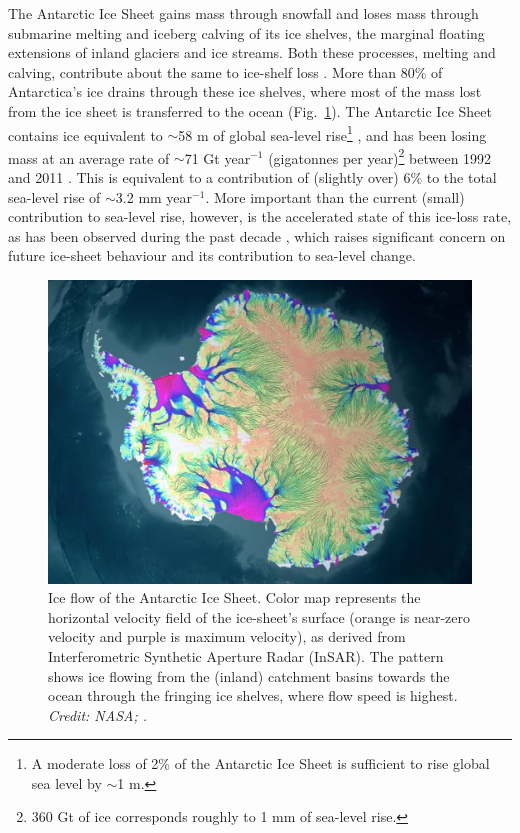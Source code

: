 \noindent
The Antarctic Ice Sheet gains mass through snowfall and loses mass through submarine melting and iceberg calving of its ice shelves, the marginal floating extensions of inland glaciers and ice streams. Both these processes, melting and calving, contribute about the same to ice-shelf loss \parencite{Rignot2013, Depoorter2013}. More than 80\% of Antarctica's ice drains through these ice shelves, where most of the mass
lost from the ice sheet is transferred to the ocean (Fig.~\ref{fig:ice-sheet-flow}). The Antarctic Ice Sheet contains ice equivalent to $\sim$58 m of global sea-level rise\footnote{A moderate loss of 2\% of the Antarctic Ice Sheet is sufficient to rise
global sea level by $\sim$1 m.} \parencite{Fretwell2013}, and has been losing mass at an average rate of
$\sim$71 Gt year$^{-1}$ (gigatonnes per year)\footnote{360 Gt of ice corresponds roughly to 1 mm of sea-level rise.} between 1992 and 2011
\parencite{Shepherd2012}. This is equivalent to a contribution of
(slightly over) 6\% to the total sea-level rise of $\sim$3.2 mm year$^{-1}$.
 More important than the current (small) contribution to sea-level rise, however, is the accelerated state of this ice-loss rate, as has been observed during the past decade \parencite{Shepherd2012, Sutterley2014, Velicogna2009, Chen2009, Harig2015}, which raises significant concern on future ice-sheet behaviour and its contribution to sea-level change. 


\begin{figure}[!ht]
  \includegraphics[width=\textwidth]{img/ice_sheet_flow2.png} %
  \caption[Ice flow of the Antarctic Ice Sheet]{
  Ice flow of the Antarctic Ice Sheet. Color map represents the horizontal velocity field of the ice-sheet's surface (orange is near-zero velocity and purple is maximum velocity), as derived from Interferometric Synthetic Aperture Radar (InSAR). The pattern shows ice flowing from the (inland) catchment basins towards the ocean through the fringing ice shelves, where flow speed is highest. {\it Credit: NASA; \textcite{Rignot2011}.}
  }
  \label{fig:ice-sheet-flow}
\end{figure}



